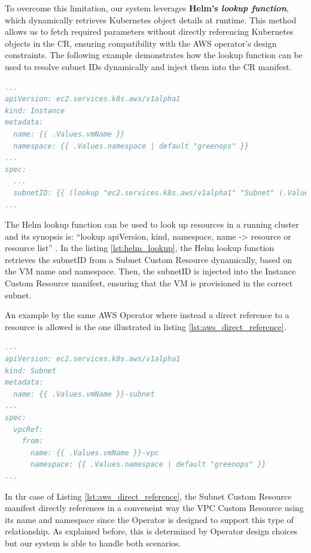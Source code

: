 To overcome this limitation, our system leverages \textbf{Helm’s \textit{lookup function}}, which dynamically retrieves Kubernetes object details at runtime. This method allows us to fetch required parameters without directly referencing Kubernetes objects in the CR, ensuring compatibility with the AWS operator’s design constraints. The following example demonstrates how the lookup function can be used to resolve subnet IDs dynamically and inject them into the CR manifest. \\

\begin{lstlisting}[language=yaml, caption={Helm Lookup example: dynamically resolving SubnetIDs}, label={lst:helm_lookup}, float=htpb]
...
apiVersion: ec2.services.k8s.aws/v1alpha1
kind: Instance
metadata:
  name: {{ .Values.vmName }}
  namespace: {{ .Values.namespace | default "greenops" }}
...
spec:
  ...
  subnetID: {{ (lookup "ec2.services.k8s.aws/v1alpha1" "Subnet" (.Values.namespace | default "greenops") (printf "%s-subnet" .Values.vmName)).status.subnetID }}
...
\end{lstlisting}

The Helm lookup function can be used to look up resources in a running cluster and its synopsis is: ``lookup apiVersion, kind, namespace, name -> resource or resource list'' \cite{helm_lookup}.
In the listing \ref{lst:helm_lookup}, the Helm lookup function retrieves the subnetID from a Subnet Custom Resource dynamically, based on the VM name and namespace. Then, the subnetID is injected into the Instance Custom Resource manifest, ensuring that the VM is provisioned in the correct subnet.

An example by the same AWS Operator where instead a direct reference to a resource is allowed is the one illustrated in listing \ref{lst:aws_direct_reference}. \\

\begin{lstlisting}[language=yaml, caption={AWS Operator direct reference example}, label={lst:aws_direct_reference}]
...
apiVersion: ec2.services.k8s.aws/v1alpha1
kind: Subnet
metadata:
  name: {{ .Values.vmName }}-subnet
...
spec:
  vpcRef: 
    from: 
      name: {{ .Values.vmName }}-vpc
      namespace: {{ .Values.namespace | default "greenops" }}
...
\end{lstlisting}

In thr case of Listing \ref{lst:aws_direct_reference}, the Subnet Custom Resource manifest directly references in a conveneint way the VPC Custom Resource using its name and namespace since the Operator is designed to support this type of relationship. As explained before, this is determined by Operator design choices but our system is able to handle both scenarios.

